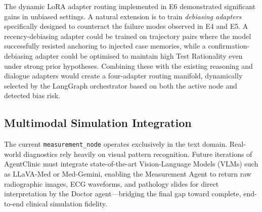 The dynamic LoRA adapter routing implemented in E6 demonstrated significant gains in unbiased settings. A natural extension is to train \textit{debiasing adapters} specifically designed to counteract the failure modes observed in E4 and E5. A recency-debiasing adapter could be trained on trajectory pairs where the model successfully resisted anchoring to injected case memories, while a confirmation-debiasing adapter could be optimised to maintain high Test Rationality even under strong prior hypotheses. Combining these with the existing reasoning and dialogue adapters would create a four-adapter routing manifold, dynamically selected by the LangGraph orchestrator based on both the active node and detected bias risk.

\subsection{Multimodal Simulation Integration}

The current \texttt{measurement\_node} operates exclusively in the text domain. Real-world diagnostics rely heavily on visual pattern recognition. Future iterations of AgentClinic must integrate state-of-the-art Vision-Language Models (VLMs) such as LLaVA-Med or Med-Gemini, enabling the Measurement Agent to return raw radiographic images, ECG waveforms, and pathology slides for direct interpretation by the Doctor agent---bridging the final gap toward complete, end-to-end clinical simulation fidelity.
